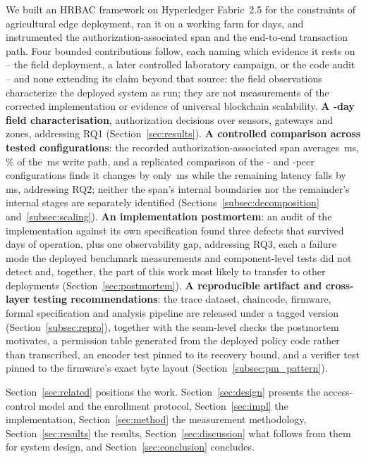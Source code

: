 \documentclass[a4paper,fleqn]{cas-sc}
\begin{document}
We built an HRBAC framework on Hyperledger Fabric~2.5 for the constraints of
agricultural edge deployment, ran it on a working farm for \DeployDays{}
days, and instrumented the authorization-associated span and the end-to-end
transaction path. Four bounded contributions follow, each naming which
evidence it rests on -- the field deployment, a later controlled
laboratory campaign, or the code audit -- and none extending its claim
beyond that source: the field observations characterize the deployed
system as run; they are not measurements of the corrected implementation
or evidence of universal blockchain scalability. \textbf{A \DeployDays{}-day
field characterisation}, \TotalDecisions{} authorization decisions over
\DeploySensors{} sensors, \DeployGateways{} gateways and \DeployZones{}
zones, addressing RQ1 (Section~\ref{sec:results}).
\textbf{A controlled comparison across tested configurations}: the recorded
authorization-associated span averages \PartAccess\,ms,
\PartAccessPct\% of the \PartTotal\,ms write path, and a replicated
comparison of the \ScaleMinPeers{}- and \ScaleMaxPeers{}-peer configurations
finds it changes by only \PartTostDiff\,ms while the remaining latency
falls by \PartEndorser\,ms, addressing RQ2; neither the span's internal
boundaries nor the remainder's internal stages are separately identified
(Sections~\ref{subsec:decomposition} and~\ref{subsec:scaling}).
\textbf{An implementation postmortem}: an audit of the implementation
against its own specification found three defects that survived
\DeployDays{} days of operation, plus one observability gap, addressing
RQ3, each a failure mode the deployed benchmark measurements and
component-level tests did not detect and, together, the part of this work
most likely to transfer to other
deployments (Section~\ref{sec:postmortem}). \textbf{A reproducible
artifact and cross-layer testing recommendations}: the trace dataset,
chaincode, firmware, formal specification and analysis pipeline are
released under a tagged version (Section~\ref{subsec:repro}), together with
the seam-level checks the postmortem motivates, a permission table
generated from the deployed policy code rather than transcribed, an
encoder test pinned to its recovery bound, and a verifier test pinned to
the firmware's exact byte layout (Section~\ref{subsec:pm_pattern}).

Section~\ref{sec:related} positions the work. Section~\ref{sec:design}
presents the access-control model and the enrollment protocol,
Section~\ref{sec:impl} the implementation, Section~\ref{sec:method} the
measurement methodology, Section~\ref{sec:results} the results,
Section~\ref{sec:discussion} what follows from them for system design, and
Section~\ref{sec:conclusion} concludes.
\end{document}
